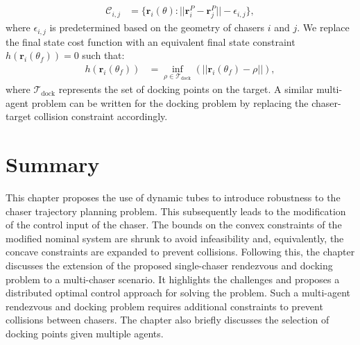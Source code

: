 \begin{align}
    {\mathcal{C}}_{i,j}&=\{\boldsymbol{r}_i(\theta):||\boldsymbol{r}^P_{i}-\boldsymbol{r}^P_{j}||-\epsilon_{i,j}\},
\end{align}
where $\epsilon_{i,j}$ is predetermined based on the geometry of chasers $i$ and $j$. We replace the final state cost function with an equivalent final state constraint $h(\boldsymbol{r}_i(\theta_f))=0$ such that:
\begin{align}
    h(\boldsymbol{r}_i(\theta_f))&=\inf_{\rho\in{\mathcal{T}}_{\text{dock}}}\left(||\boldsymbol{r}_i(\theta_f)-\rho||\right),
\end{align}
where ${\mathcal{T}}_{\text{dock}}$ represents the set of docking points on the target.
A similar multi-agent problem can be written for the docking problem by replacing the chaser-target collision constraint accordingly.

\section{Summary}
This chapter proposes the use of dynamic tubes to introduce robustness to the chaser trajectory planning problem.
This subsequently leads to the modification of the control input of the chaser.
The bounds on the convex constraints of the modified nominal system are shrunk to avoid infeasibility and, equivalently, the concave constraints are expanded to prevent collisions.
Following this, the chapter discusses the extension of the proposed single-chaser rendezvous and docking problem to a multi-chaser scenario.
It highlights the challenges and proposes a distributed optimal control approach for solving the problem.
Such a multi-agent rendezvous and docking problem requires additional constraints to prevent collisions between chasers.
The chapter also briefly discusses the selection of docking points given multiple agents.